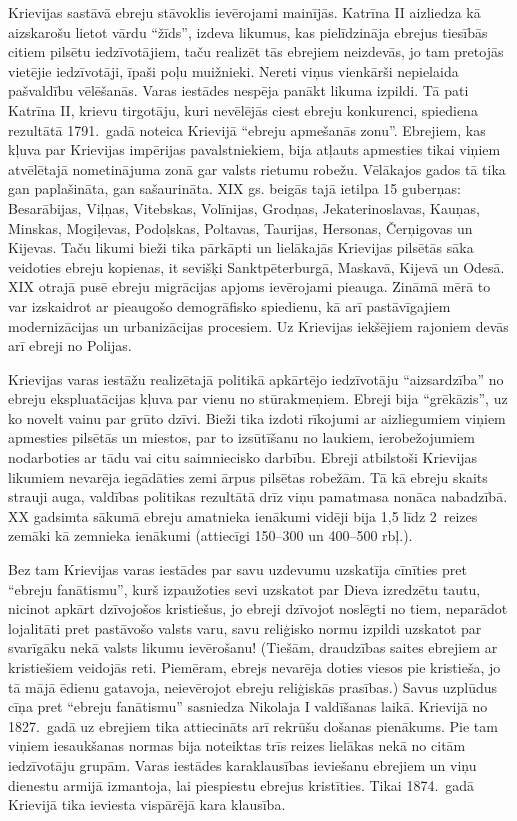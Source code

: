 \documentclass[twoside,a5paper,12pt,fleqn,openany]{extbook}
\begin{document}
Krievijas sastāvā ebreju stāvoklis ievērojami mainījās. Katrīna II aizliedza kā aizskarošu lietot vārdu ``žīds'', izdeva likumus, kas pielīdzināja ebrejus tiesībās citiem pilsētu iedzīvotājiem, taču realizēt tās ebrejiem neizdevās, jo tam pretojās vietējie iedzīvotāji, īpaši poļu muižnieki. Nereti viņus vienkārši nepielaida pašvaldību vēlēšanās. Varas iestādes nespēja panākt likuma izpildi. Tā pati Katrīna II, krievu tirgotāju, kuri nevēlējās ciest ebreju konkurenci, spiediena rezultātā 1791.~gadā noteica Krievijā ``ebreju apmešanās zonu''. Ebrejiem, kas kļuva par Krievijas impērijas pavalstniekiem, bija atļauts apmesties tikai viņiem atvēlētajā nometinājuma zonā gar valsts rietumu robežu. Vēlākajos gados tā tika gan paplašināta, gan sašaurināta. XIX gs. beigās tajā ietilpa 15 guberņas: Besarābijas, Viļņas, Vitebskas, Volīnijas, Grodņas, Jekaterinoslavas, Kauņas, Minskas, Mogiļevas, Podoļskas, Poltavas, Taurijas, Hersonas, Čerņigovas un Kijevas. Taču likumi bieži tika pārkāpti un lielākajās Krievijas pilsētās sāka veidoties ebreju kopienas, it sevišķi Sanktpēterburgā, Maskavā, Kijevā un Odesā. XIX otrajā pusē ebreju migrācijas apjoms ievērojami pieauga. Zināmā mērā to var izskaidrot ar pieaugošo demogrāfisko spiedienu, kā arī pastāvīgajiem modernizācijas un urbanizācijas procesiem. Uz Krievijas iekšējiem rajoniem devās arī ebreji no Polijas.

Krievijas varas iestāžu realizētajā politikā apkārtējo iedzīvotāju ``aizsardzība'' no ebreju ekspluatācijas kļuva par vienu no stūrakmeņiem. Ebreji bija ``grēkāzis'', uz ko novelt vainu par grūto dzīvi. Bieži tika izdoti rīkojumi ar aizliegumiem viņiem apmesties pilsētās un miestos, par to izsūtīšanu no laukiem, ierobežojumiem nodarboties ar tādu vai citu saimniecisko darbību. Ebreji atbilstoši Krievijas likumiem nevarēja iegādāties zemi ārpus pilsētas robežām. Tā kā ebreju skaits strauji auga, valdības politikas rezultātā drīz viņu pamatmasa nonāca nabadzībā. XX gadsimta sākumā ebreju amatnieka ienākumi vidēji bija 1,5 līdz 2~reizes zemāki kā zemnieka ienākumi (attiecīgi 150--300 un 400--500 rbļ.).

Bez tam Krievijas varas iestādes par savu uzdevumu uzskatīja cīnīties pret ``ebreju fanātismu'', kurš izpaužoties sevi uzskatot par Dieva izredzētu tautu, nicinot apkārt dzīvojošos kristiešus, jo ebreji dzīvojot noslēgti no tiem, neparādot lojalitāti pret pastāvošo valsts varu, savu reliģisko normu izpildi uzskatot par svarīgāku nekā valsts likumu ievērošanu! (Tiešām, draudzības saites ebrejiem ar kristiešiem veidojās reti. Piemēram, ebrejs nevarēja doties viesos pie kristieša, jo tā mājā ēdienu gatavoja, neievērojot ebreju reliģiskās prasības.) Savus uzplūdus cīņa pret ``ebreju fanātismu'' sasniedza Nikolaja I valdīšanas laikā. Krievijā no 1827.~gadā uz ebrejiem tika attiecināts arī rekrūšu došanas pienākums. Pie tam viņiem iesaukšanas normas bija noteiktas trīs reizes lielākas nekā no citām iedzīvotāju grupām. Varas iestādes karaklausības ieviešanu ebrejiem un viņu dienestu armijā izmantoja, lai piespiestu ebrejus kristīties. Tikai 1874.~gadā Krievijā tika ieviesta vispārējā kara klausība.
\end{document}
